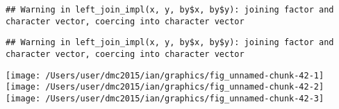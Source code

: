\documentclass[10pt]{report}
\newenvironment{Shaded}{}{}
\newcommand{\KeywordTok}[1]{\textcolor[rgb]{0.00,0.44,0.13}{\textbf{{#1}}}}
\newcommand{\DataTypeTok}[1]{\textcolor[rgb]{0.56,0.13,0.00}{{#1}}}
\newcommand{\StringTok}[1]{\textcolor[rgb]{0.25,0.44,0.63}{{#1}}}
\newcommand{\NormalTok}[1]{{#1}}
\begin{document}
\begin{verbatim}
## Warning in left_join_impl(x, y, by$x, by$y): joining factor and character vector, coercing into character vector
\end{verbatim}

\begin{Shaded}
\end{Shaded}

\begin{verbatim}
## Warning in left_join_impl(x, y, by$x, by$y): joining factor and character vector, coercing into character vector
\end{verbatim}

\begin{Shaded}
\end{Shaded}

\begin{center}\texttt{[image: /Users/user/dmc2015/ian/graphics/fig\_unnamed-chunk-42-1]} \texttt{[image: /Users/user/dmc2015/ian/graphics/fig\_unnamed-chunk-42-2]} \texttt{[image: /Users/user/dmc2015/ian/graphics/fig\_unnamed-chunk-42-3]} \end{center}
\end{document}
